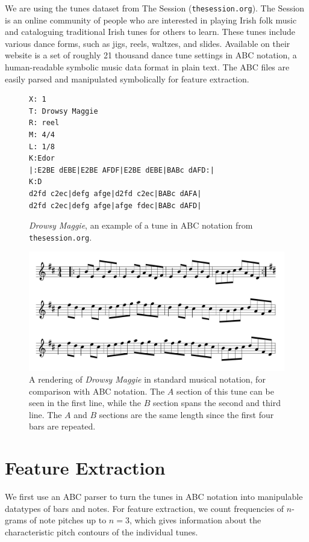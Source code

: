\documentclass{article} %
\begin{document}
We are using the tunes dataset from The Session (\texttt{thesession.org}). The
Session is an online community of people who are interested in playing Irish
folk music and cataloguing traditional Irish tunes for others to learn. These
tunes include various dance forms, such as jigs, reels, waltzes, and slides.
Available on their website is a set of roughly 21 thousand dance tune settings
in ABC notation, a human-readable symbolic music data format in plain text. The
ABC files are easily parsed and manipulated symbolically for feature extraction.
\FloatBarrier
\begin{figure}
  \begin{verbatim}
X: 1
T: Drowsy Maggie
R: reel
M: 4/4
L: 1/8
K:Edor
|:E2BE dEBE|E2BE AFDF|E2BE dEBE|BABc dAFD:|
K:D
d2fd c2ec|defg afge|d2fd c2ec|BABc dAFA|
d2fd c2ec|defg afge|afge fdec|BABc dAFD|
  \end{verbatim}
  \caption{\textit{Drowsy Maggie}, an example of a tune in ABC notation from
  \texttt{thesession.org}.}
\end{figure}
\begin{figure}
  \begin{center}
    \includegraphics[width=5in]{drowsymaggie.png}
  \end{center}
  \caption{A rendering of \textit{Drowsy Maggie} in standard musical notation, for
  comparison with ABC notation. The $A$ section of this tune can be seen in the
first line, while the $B$ section spans the second and third line. The $A$ and
$B$ sections are the same length since the first four bars are repeated.}
\end{figure}

\section{Feature Extraction}

We first use an ABC parser to turn the tunes in ABC notation into manipulable
datatypes of bars and notes. For feature extraction, we count frequencies of
$n$-grams of note pitches up to $n=3$, which gives information about the
characteristic pitch contours of the individual tunes.
\end{document}
